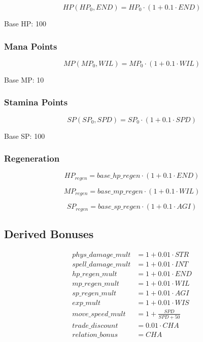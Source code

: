 \begin{equation}
HP(HP_0, END) = HP_0 \cdot (1 + 0.1 \cdot END)
\end{equation}

Base HP: 100

\subsubsection{Mana Points}

\begin{equation}
MP(MP_0, WIL) = MP_0 \cdot (1 + 0.1 \cdot WIL)
\end{equation}

Base MP: 10

\subsubsection{Stamina Points}

\begin{equation}
SP(SP_0, SPD) = SP_0 \cdot (1 + 0.1 \cdot SPD)
\end{equation}

Base SP: 100



\subsubsection{Regeneration}

\begin{equation}
HP_{regen} = base\_hp\_regen \cdot (1 + 0.1 \cdot END)
\end{equation}

\begin{equation}
MP_{regen} = base\_mp\_regen \cdot (1 + 0.1 \cdot WIL)
\end{equation}

\begin{equation}
SP_{regen} = base\_sp\_regen \cdot (1 + 0.1 \cdot AGI)
\end{equation}



\subsection{Derived Bonuses}

\begin{align}
phys\_damage\_mult &= 1 + 0.01 \cdot STR \\
spell\_damage\_mult &= 1 + 0.01 \cdot INT \\
hp\_regen\_mult &= 1 + 0.01 \cdot END \\
mp\_regen\_mult &= 1 + 0.01 \cdot WIL \\
sp\_regen\_mult &= 1 + 0.01 \cdot AGI \\
exp\_mult &= 1 + 0.01 \cdot WIS \\
move\_speed\_mult &= 1 + \frac{SPD}{SPD + 50} \\
trade\_discount &= 0.01 \cdot CHA \\
relation\_bonus &= CHA
\end{align}



